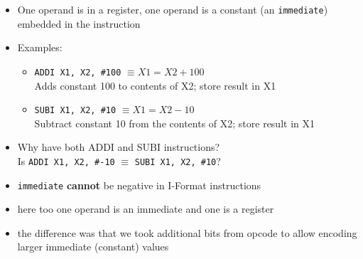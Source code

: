 \begin{frame}[fragile]

\begin{itemize}  
     \item One operand is in a register, one operand is a constant (an {\tt immediate}) embedded in the instruction
     \item Examples: 
     \begin{itemize}
         \item \texttt{ADDI X1, X2, \#100} $\equiv X1 = X2 + 100$ \\
   Adds constant 100 to contents of X2; store result in X1
    \item \texttt{SUBI X1, X2, \#10} $\equiv X1 = X2 - 10$\\
   Subtract constant 10 from the contents of X2; store result in X1
     \end{itemize}    
 \end{itemize}
 \begin{tcolorbox}[enhanced,attach boxed title to top center={yshift=-3mm,yshifttext=-1mm},
  colback=blue!5!white,colframe=blue!75!black,colbacktitle=blue!80!black,
  title=Think About It,fonttitle=\bfseries,
  boxed title style={size=small,colframe=red!50!black} ]
  \begin{itemize}
      \item Why have both ADDI and SUBI instructions?\\
   Is {\tt ADDI X1, X2, \#-10} $\equiv$ {\tt SUBI X1, X2, \#10}? \ifnum{}\fi
      \item {\tt immediate} \textbf{cannot} be negative in I-Format instructions
  \end{itemize}
\end{tcolorbox}

\BNotes\ifnum{}
\begin{itemize}
\item here too one operand is an immediate and one is a register
\item the difference was that we took additional bits from opcode to allow encoding larger immediate (constant) values
\end{itemize}
\fi
 
 \end{frame}


